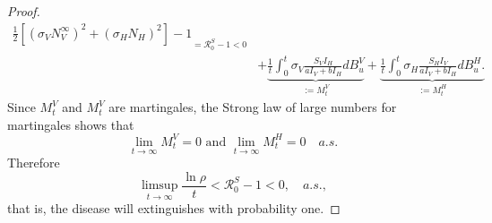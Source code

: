 \begin{proof}
\begin{equation}
\begin{aligned}
{                    \frac{1}{2}
                    \left [
                        \left(
                            \sigma_V N_V ^ \infty
                        \right) ^ 2
                        +
                        \left(
                            \sigma_H N_H
                        \right) ^2
                    \right ] - 1
                }_{=\mathcal{R}_0 ^ S - 1 < 0}
                \\
                & +
                \underbrace{
                    \frac{1}{t}
                    \int_{0}^{t}
                        \sigma_V 
                        \frac{S_V I_H}{a I_V + b I_H}
                    d B_u ^ V
               }_{:=M_t^V}
                +
               \underbrace{
                    \frac{1}{t}
                    \int_{0}^{t}
                        \sigma_H
                        \frac{S_H I_V}{a I_V + b I_H}
                    d B_u ^ H.
               }_{:= M_t ^ H}
        \end{aligned}
    \end{equation}
    Since $M_t^V$ and $M_t^V$ are martingales, the Strong law of large 
    numbers for martingales {\citet[p. 12, Thm. 3.4]{Mao2007}} shows that
    $$
        \lim_{t \to \infty}
            M_t^V = 0 \text{ and }
        \lim_{t \to \infty}
            M_t^H = 0 
        \quad a.s.
    $$    
    Therefore
    $$
        \limsup_{t \to \infty}
            \frac{\ln \rho}{t} <
            \mathcal{R}_0 ^ S - 1 < 0, \quad a.s.,
    $$
    that is, the disease will extinguishes with probability one.
\end{proof}
